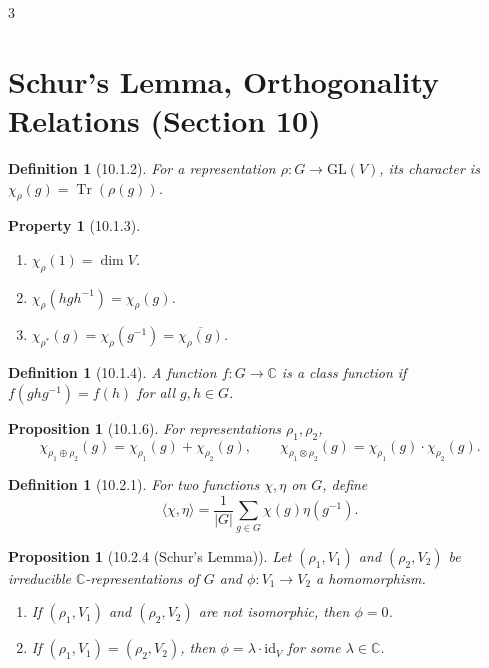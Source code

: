 \documentclass[10pt,landscape]{article}
\newtheorem{definition}[theorem]{Definition}
\newtheorem{proposition}[theorem]{Proposition}
\newtheorem{property}[theorem]{Property}
\begin{document}
\begin{multicols}{3}
\section{Schur's Lemma, Orthogonality Relations (Section 10)}

\begin{definition}[10.1.2]
For a representation $\rho: G\to \mathrm{GL}(V)$, its character is $\chi_\rho(g) = \operatorname{Tr}(\rho(g))$.
\end{definition}

\begin{property}[10.1.3]
\begin{enumerate}
\item $\chi_\rho(1) = \dim V$.
\item $\chi_\rho(hgh^{-1}) = \chi_\rho(g)$.
\item $\chi_{\rho^*}(g) = \chi_\rho(g^{-1}) = \overline{\chi_\rho(g)}$.
\end{enumerate}
\end{property}

\begin{definition}[10.1.4]
A function $f: G\to \mathbb{C}$ is a class function if $f(ghg^{-1}) = f(h)$ for all $g,h\in G$.
\end{definition}

\begin{proposition}[10.1.6]
For representations $\rho_1,\rho_2$,
\[
\chi_{\rho_1\oplus\rho_2}(g) = \chi_{\rho_1}(g) + \chi_{\rho_2}(g), \qquad
\chi_{\rho_1\otimes\rho_2}(g) = \chi_{\rho_1}(g)\cdot \chi_{\rho_2}(g).
\]
\end{proposition}

\begin{definition}[10.2.1]
For two functions $\chi,\eta$ on $G$, define
\[
\langle \chi,\eta \rangle = \frac{1}{|G|}\sum_{g\in G} \chi(g)\eta(g^{-1}).
\]
\end{definition}

\begin{proposition}[10.2.4 (Schur's Lemma)]
Let $(\rho_1,V_1)$ and $(\rho_2,V_2)$ be irreducible $\mathbb{C}$-representations of $G$ and $\phi: V_1\to V_2$ a homomorphism.
\begin{enumerate}
\item If $(\rho_1,V_1)$ and $(\rho_2,V_2)$ are not isomorphic, then $\phi = 0$.
\item If $(\rho_1,V_1)=(\rho_2,V_2)$, then $\phi = \lambda \cdot \mathrm{id}_V$ for some $\lambda\in\mathbb{C}$.
\end{enumerate}
\end{proposition}


\end{multicols}
\end{document}
